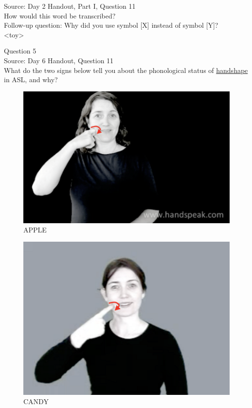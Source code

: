\documentclass[12pt]{article}
\begin{document}
Source: Day 2 Handout, Part I, Question 11\\

How would this word be transcribed?\\ Follow-up question: Why did you use symbol [X] instead of symbol [Y]?\\

<toy>


\newpage

{\large Question 5}\\

Source: Day 6 Handout, Question 11\\

What do the two signs below tell you about the phonological status of \underline{handshape} in ASL, and why?\\

\begin{figure}[H]
\includegraphics{../images/asl_apple.png}
\caption{APPLE}
\end{figure}
\begin{figure}[H]
\includegraphics{../images/asl_candy.png}
\caption{CANDY}
\end{figure}
\end{document}
